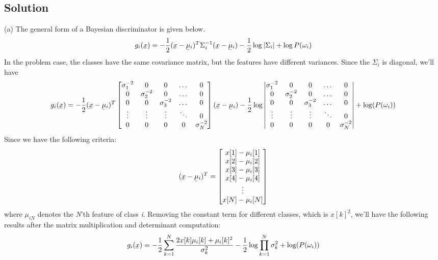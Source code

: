 \documentclass[12pt]{article}
\numberwithin{equation}{section}
\numberwithin{table}{section}
\numberwithin{figure}{section}
\begin{document}
\subsection*{Solution}
(a) The general form of a Bayesian discriminator is given below.
\begin{equation}\label{eq:1.1}
g_{i}(\underaccent{\bar}{x}) = 	-\frac{1}{2}(\underaccent{\bar}{x} - \underaccent{\bar}{\mu}_{i})^{T}\Sigma_{i}^{-1}(\underaccent{\bar}{x} - \underaccent{\bar}{\mu}_{i}) - \frac{1}{2}\log|\Sigma_{i}| + \log P(\omega_{i})
\end{equation}
In the problem case, the classes have the same covariance matrix, but the features have different variances.
Since the $\Sigma_{i}$ is diagonal, we'll have
$$
g_{i}(\underaccent{\bar}{x}) = 	-\frac{1}{2}(\underaccent{\bar}{x} - \underaccent{\bar}{\mu}_{i})^{T}
	\begin{bmatrix}
\sigma_1^{-2} & 0 & 0 & \dots & 0\\
0 & \sigma_2^{-2} & 0 & \dots & 0\\
0 & 0 & \sigma_3^{-2} & \dots & 0\\ 
\vdots & \vdots & \vdots & \ddots & 0\\
0 & 0 & 0 & 0 & \sigma_N^{-2}\\
\end{bmatrix}
(\underaccent{\bar}{x} - \underaccent{\bar}{\mu}_{i}) - \frac{1}{2}\log \begin{vmatrix}
\sigma_1^{-2} & 0 & 0 & \dots & 0\\
0 & \sigma_2^{-2} & 0 & \dots & 0\\
0 & 0 & \sigma_3^{-2} & \dots & 0\\ 
\vdots & \vdots & \vdots & \ddots & 0\\
0 & 0 & 0 & 0 & \sigma_N^{-2}\\
\end{vmatrix} + \log(P(\omega_{i}))
$$
Since we have the following criteria:
$$
	(\underaccent{\bar}{x} - \underaccent{\bar}{\mu}_{i})^{T} = \begin{bmatrix}
	x[1] - \mu_{i}[1]\\
	x[2] - \mu_{i}[2]\\
	x[3] - \mu_{i}[3]\\
	x[4] - \mu_{i}[4]\\
	\vdots\\
	x[N] - \mu_{i}[N]\\
	\end{bmatrix}
$$
where $\mu_{iN}$ denotes the \textit{N}'th feature of class \textit{i}. Removing the constant term for different classes, which is $ x[k]^2$, we'll have the following results after the matrix multiplication and determinant computation:
\begin{equation}
	g_{i}(\underaccent{\bar}{x}) = -\frac{1}{2}\sum_{k=1}^{N}\frac{2x[k]\mu_{i}[k] + \mu_{i}[k]^2}{\sigma_k^2} - \frac{1}{2}\log\prod_{k=1}^{N}\sigma_k^2 + \log(P(\omega_i))
\end{equation}
\end{document}
